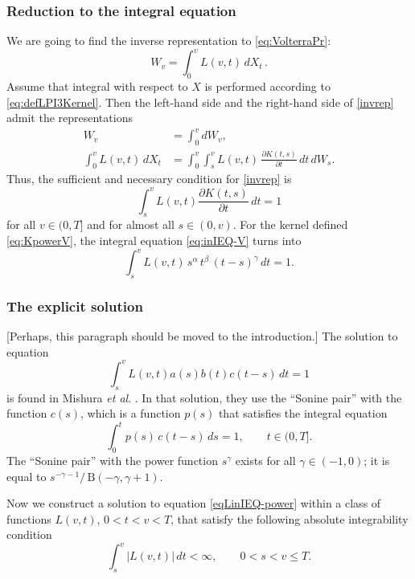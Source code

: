 \documentclass{article}
\def\dKdt(#1,#2){\frac{\partial K(#1,#2)}{\partial #1}}
\newcommand{\vS}{v}
\theoremstyle{plain}
\theoremstyle{remark}
\theoremstyle{definition}
\begin{document}
\subsubsection*{Reduction to the integral equation}
We are going to find the inverse representation to \eqref{eq:VolterraPr}:
\begin{equation}\label{invrep}
W_\vS = \int_0^\vS L(\vS,t) \, dX_t \, .
\end{equation}
Assume that integral with respect to $X$ is performed according
to \eqref{eq:defLPI3Kernel}. %
Then the left-hand side and the right-hand side of \eqref{invrep} admit the representations
\begin{align*}
W_\vS &= \int_0^\vS dW_\vS, \\
\int_0^\vS L(\vS,t) \, dX_t &= \int_0^\vS \int_s^\vS L(\vS,t)\, \dKdt(t,s) \, dt\, dW_s.
\end{align*}
Thus,
the sufficient and necessary condition for \eqref{invrep} is
\begin{equation}\label{eq:inIEQ-V}
\int_s^\vS L(\vS,t) \dKdt(t,s) \, dt = 1
\end{equation}
for all $\vS\in(0,T]$ and for almost all $s\in(0,\vS)$.
For the kernel defined %
\eqref{eq:KpowerV},
the integral equation \eqref{eq:inIEQ-V} turns into
\begin{equation}\label{eqLinIEQ-power}
\int_s^\vS L(\vS,t)\, s^\alpha\, t^\beta\, (t-s)^\gamma \, dt = 1.
\end{equation}
\subsubsection*{The explicit solution}
[Perhaps, this paragraph should be moved to the introduction.]
The solution to equation
\[
\int_s^\vS L(\vS,t) a(s) b(t) c(t-s) \, dt = 1
\]
is found in
Mishura \textit{et al}.\@{} \cite[Proposition 3]{arXiv03405}.
In that solution, they use the ``Sonine pair'' with the function $c(s)$, which is
a function $p(s)$ that satisfies the integral equation
\[
\int_0^t p(s) \, c(t-s) \, ds = 1, \qquad t\in(0,T].
\]
The ``Sonine pair'' with the power function $s^\gamma$ exists for all $\gamma\in(-1,0)$;
it is equal to $s^{-\gamma-1} / \, \mathrm{B}(-\gamma, \gamma{+}1)$.


Now we construct a solution to equation \eqref{eqLinIEQ-power}
within a class of functions $L(\vS,t)$, $0<t<\vS<T$,
that satisfy the following absolute integrability condition
\begin{equation}\label{eq:abocon}
\int_s^\vS |L(\vS,t)| \, dt < \infty, \qquad
0\mathbin{<}s\mathbin{<}\vS\mathbin{\le}T.
\end{equation}
\end{document}
